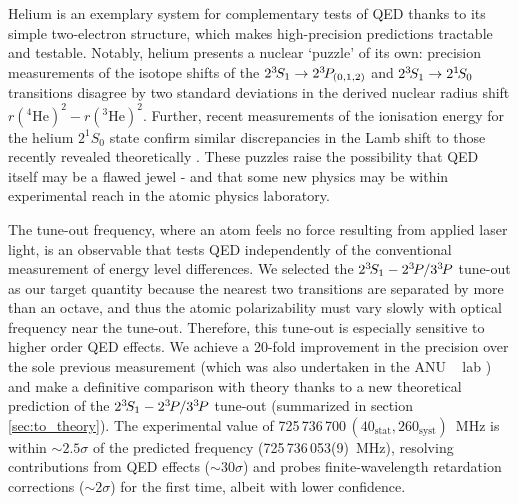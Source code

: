 	Helium is an exemplary system for complementary tests of QED thanks to its simple two-electron structure, which makes high-precision predictions tractable and testable. 
	Notably, helium presents a nuclear `puzzle' of its own: precision measurements of the isotope shifts of the \(2^{3\!}S_1 \rightarrow 2^{3\!}P_{(0,1,2)} \) \cite{Zheng17} and \(2^{3\!}S_1 \rightarrow 2^{1\!}S_0 \) \cite{Rengelink18} transitions disagree by two standard deviations in the derived nuclear radius shift $r(^4\textrm{He})^2-r(^3\textrm{He})^2$. 
	Further, recent measurements of the ionisation energy for the helium $2^{1\!}S_0$ state \cite{Clausen21} confirm similar discrepancies in the Lamb shift to those recently revealed theoretically \cite{Patkos21}.
	These puzzles raise the possibility that QED itself may be a flawed jewel \cite{Hill17} - and that some new physics may be within experimental reach in the atomic physics laboratory. 

	The tune-out frequency, where an atom feels no force resulting from applied laser light, is an observable that tests QED independently of the conventional measurement of energy level differences.
	We selected the $2^{3\!}S_1-2^{3\!} P/3^{3\!} P$ tune-out as our target quantity because the nearest two transitions are separated by more than an octave, and thus the atomic polarizability must vary slowly with optical frequency near the tune-out. 
	Therefore, this tune-out is especially sensitive to higher order QED effects. 
	We achieve a 20-fold improvement in the precision over the sole previous measurement (which was also undertaken in the ANU \mhe~ lab \cite{Henson15}) and make a definitive comparison with theory thanks to a new theoretical prediction of the \(2^{3\!}S_1- 2^{3\!}P / 3^{3\!}P\) tune-out (summarized in section \ref{sec:to_theory}).
	The experimental value of 725\,736\,700\,$(40_{\mathrm{stat}},260_{\mathrm{syst}})$~MHz is within \({\sim} 2.5\sigma\) of the predicted frequency (725\,736\,053(9)~MHz),   resolving contributions from QED effects (\({\sim} 30 \sigma\)) and probes finite-wavelength retardation corrections (\({\sim} 2 \sigma\)) for the first time, albeit with lower confidence.



